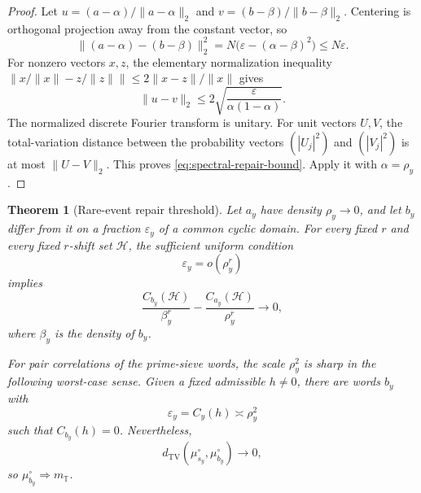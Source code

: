 \documentclass[11pt]{article}
\newtheorem{theorem}{Theorem}[section]
\theoremstyle{definition}
\theoremstyle{remark}
\newcommand{\T}{\mathbb T}
\newcommand{\cH}{\mathcal H}
\newcommand{\eps}{\varepsilon}
\newcommand{\TV}{\mathrm{TV}}
\begin{document}
\begin{proof}
Let $u=(a-\alpha)/\|a-\alpha\|_2$ and $v=(b-\beta)/\|b-\beta\|_2$.  Centering is orthogonal projection away from the constant vector, so
\[
 \|(a-\alpha)-(b-\beta)\|_2^2
 =N\bigl(\eps-(\alpha-\beta)^2\bigr)\le N\eps.
\]
For nonzero vectors $x,z$, the elementary normalization inequality
$\|x/\|x\|-z/\|z\|\|\le2\|x-z\|/\|x\|$ gives
\[
    \|u-v\|_2\le2\sqrt{\frac{\eps}{\alpha(1-\alpha)}}.
\]
The normalized discrete Fourier transform is unitary.  For unit vectors $U,V$, the total-variation distance between the probability vectors $(|U_j|^2)$ and $(|V_j|^2)$ is at most $\|U-V\|_2$.  This proves \eqref{eq:spectral-repair-bound}.  Apply it with $\alpha=\rho_y$.
\end{proof}

\begin{theorem}[Rare-event repair threshold]\label{thm:rare-repair}
Let $a_y$ have density $\rho_y\to0$, and let $b_y$ differ from it on a fraction $\eps_y$ of a common cyclic domain.  For every fixed $r$ and every fixed $r$-shift set $\cH$, the sufficient uniform condition
\begin{equation}\label{eq:rpoint-repair-scale}
    \eps_y=o(\rho_y^r)
\end{equation}
implies
\begin{equation}\label{eq:rpoint-transfer}
 \frac{C_{b_y}(\cH)}{\beta_y^r}
 -\frac{C_{a_y}(\cH)}{\rho_y^r}
 \longrightarrow0,
\end{equation}
where $\beta_y$ is the density of $b_y$.

For pair correlations of the prime-sieve words, the scale $\rho_y^2$ is sharp in the following worst-case sense.  Given a fixed admissible $h\ne0$, there are words $b_y$ with
\begin{equation}\label{eq:sharp-repair-size}
    \eps_y=C_y(h)\asymp\rho_y^2
\end{equation}
such that $C_{b_y}(h)=0$.  Nevertheless,
\begin{equation}\label{eq:sharp-spectral-survival}
    d_{\TV}(\mu_{s_y}^\circ,\mu_{b_y}^\circ)\longrightarrow0,
\end{equation}
so $\mu_{b_y}^\circ\Rightarrow m_{\T}$.
\end{theorem}
\end{document}
